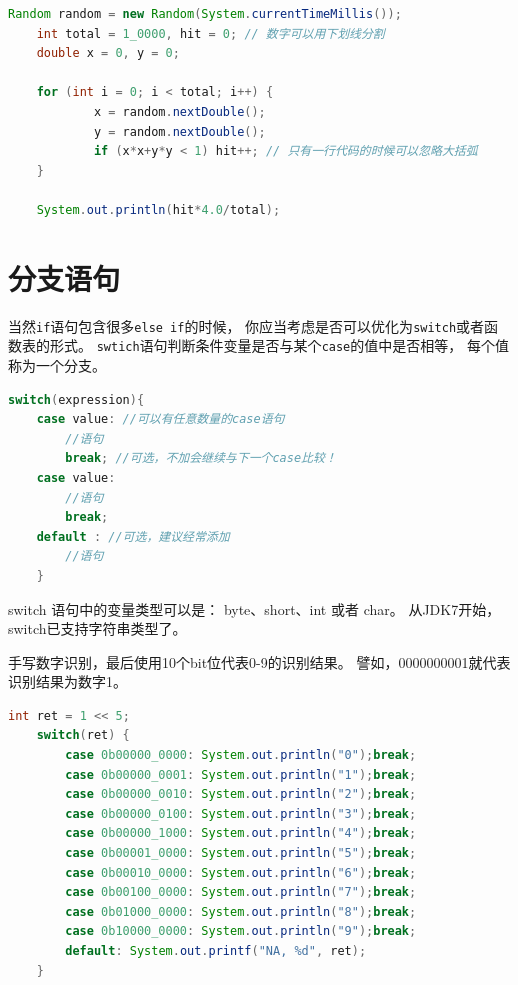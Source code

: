 \begin{lstlisting}[language=Java]
	Random random = new Random(System.currentTimeMillis());
	int total = 1_0000, hit = 0; // 数字可以用下划线分割
	double x = 0, y = 0;

	for (int i = 0; i < total; i++) {
			x = random.nextDouble();
			y = random.nextDouble();
			if (x*x+y*y < 1) hit++; // 只有一行代码的时候可以忽略大括弧
	}

	System.out.println(hit*4.0/total);
\end{lstlisting}

\section{分支语句}
当然\lstinline{if}语句包含很多\lstinline{else if}的时候，
你应当考虑是否可以优化为\lstinline{switch}或者函数表的形式。
\lstinline{swtich}语句判断条件变量是否与某个\lstinline{case}的值中是否相等，
每个值称为一个分支。

\begin{lstlisting}[language=Java]
	switch(expression){
	case value: //可以有任意数量的case语句
		//语句
		break; //可选，不加会继续与下一个case比较！
	case value:
		//语句
		break;
	default : //可选，建议经常添加
		//语句
	}
\end{lstlisting}

\noindent
switch 语句中的变量类型可以是： byte、short、int 或者 char。
从JDK7开始，switch已支持字符串类型了。
\bigskip
{}
\bigskip

\begin{example}
	手写数字识别，最后使用10个bit位代表0-9的识别结果。
	譬如，0000000001就代表识别结果为数字1。
\end{example}

\begin{lstlisting}[language=Java]
	int ret = 1 << 5;
	switch(ret) {
		case 0b00000_0000: System.out.println("0");break;
		case 0b00000_0001: System.out.println("1");break;
		case 0b00000_0010: System.out.println("2");break;
		case 0b00000_0100: System.out.println("3");break;
		case 0b00000_1000: System.out.println("4");break;
		case 0b00001_0000: System.out.println("5");break;
		case 0b00010_0000: System.out.println("6");break;
		case 0b00100_0000: System.out.println("7");break;
		case 0b01000_0000: System.out.println("8");break;
		case 0b10000_0000: System.out.println("9");break;
		default: System.out.printf("NA, %d", ret);
	}
\end{lstlisting}

